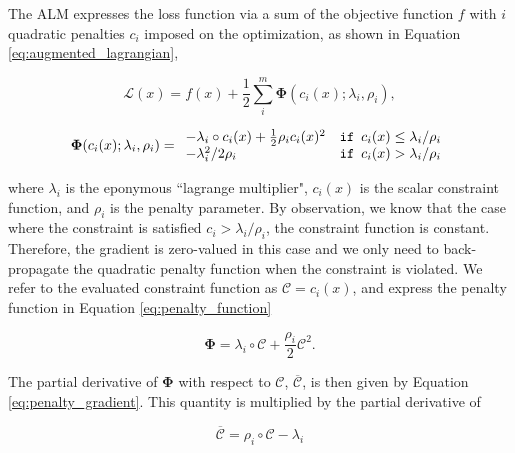\documentclass[]{spie}  %
\begin{document}
The ALM expresses the loss function via a sum of the objective function $f$ with $i$ quadratic penalties $c_i$ imposed on the optimization, as shown in Equation \ref{eq:augmented_lagrangian},

\begin{equation}
    \mathcal{L}(x) = f(x) + \frac{1}{2}\sum_i^m \mathbf{\Phi}(c_i(x); \lambda_i, \rho_i),
    \label{eq:augmented_lagrangian}
\end{equation}

\begin{equation}
     \mathbf{\Phi}(c_i(x); \lambda_i, \rho_i) = 
        \begin{array}{l l}
             
     -\lambda_i \circ c_i(x) + \frac{1}{2}\rho_i c_i(x)^2 & \texttt{if}\phantom{o} c_i(x) \leq \lambda_i/\rho_i  \\
     -\lambda_i^2/2\rho_i & \texttt{if}\phantom{o} c_i(x) > \lambda_i/\rho_i
        \end{array}
\end{equation}

where $\lambda_i$ is the eponymous ``lagrange multiplier", $c_i(x)$ is the scalar constraint function, and $\rho_i$ is the penalty parameter. By observation, we know that the case where the constraint is satisfied $c_i > \lambda_i/\rho_i$, the constraint function is constant. Therefore, the gradient is zero-valued in this case and we only need to back-propagate the quadratic penalty function when the constraint is violated. We refer to the evaluated constraint function as $\mathcal{C}=c_i(x)$, and express the penalty function in Equation \ref{eq:penalty_function}

\begin{equation}
    \mathbf{\Phi} = \lambda_i \circ \mathcal{C} + \frac{\rho_i}{2} \mathcal{C}^2.
    \label{eq:penalty_function}
\end{equation}

The partial derivative of $\mathbf{\Phi}$ with respect to $\mathcal{C}$, $\overline{\mathcal{C}}$, is then given by Equation \ref{eq:penalty_gradient}. This quantity is multiplied by the partial derivative of 

\begin{equation}
    \overline{\mathcal{C}} = \rho_i \circ \mathcal{C} - \lambda_i
    \label{eq:penalty_gradient}
\end{equation}


\acknowledgments %
 
\end{document}
